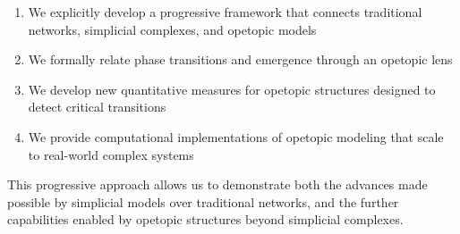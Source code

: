 \begin{enumerate}
    \item We explicitly develop a progressive framework that connects traditional networks, simplicial complexes, and opetopic models
    \item We formally relate phase transitions and emergence through an opetopic lens
    \item We develop new quantitative measures for opetopic structures designed to detect critical transitions
    \item We provide computational implementations of opetopic modeling that scale to real-world complex systems
\end{enumerate}

This progressive approach allows us to demonstrate both the advances made possible by simplicial models over traditional networks, and the further capabilities enabled by opetopic structures beyond simplicial complexes.